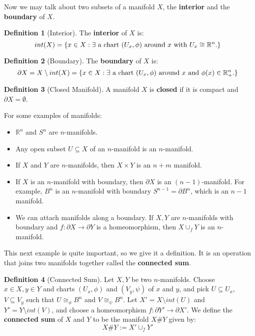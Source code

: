 \documentclass[11pt, oneside]{amsart}   	%
\theoremstyle{definition}
\newtheorem{definition}{Definition}[section]
\begin{document}
	Now we may talk about two subsets of a manifold $X$, the \textbf{interior} and the \textbf{boundary} of $X$.
	
	\begin{definition}[Interior]
		The \textbf{interior} of $X$ is:
		$$
			int(X) = \{x\in X : \exists\textnormal{ a chart $(U_x, \phi)$ around $x$ with $U_x\cong\mathbb R^n$.}\}
		$$
	\end{definition}
	
	\begin{definition}[Boundary]
		The \textbf{boundary} of $X$ is:
		$$
			\partial X = X\setminus int(X) = \{x\in X : \exists\textnormal{ a chart $(U_x, \phi)$ around $x$ and $\phi(x)\in\mathbb R^n_+$.}\}
		$$
	\end{definition}
	
	\begin{definition}[Closed Manifold]
		A manifold $X$ is \textbf{closed} if it is compact and $\partial X = \emptyset$.
	\end{definition}
	
	For some examples of manifolds:
	
		\begin{itemize}
		
		\item $\mathbb R^n$ and $S^n$ are $n$-manifolds.
		
		\item Any open subset $U\subseteq X$ of an $n$-manifold is an $n$-manifold.
		
		\item If $X$ and $Y$ are $n$-manifolds, then $X\times Y$ is an $n + m$ manifold.
		
		\item If $X$ is an $n$-manifold with boundary, then $\partial X$ is an $(n - 1)$-manifold. For example, $B^n$ is an $n$-manifold with boundary $S^{n - 1} 
		= \partial B^n$, which is an $n - 1$ manifold.
		
		\item We can attach manifolds along a boundary. If $X, Y$ are $n$-manifolds with boundary and $f : \partial X\rightarrow\partial Y$ is a homeomorphism, 
		then $X\cup_f Y$ is an $n$-manifold.
		
	\end{itemize}
	
	This next example is quite important, so we give it a definition. It is an operation that joins two manifolds together called the \textbf{connected sum}.
	
	\begin{definition}[Connected Sum]
		Let $X, Y$ be two $n$-manifolds. Choose $x\in X, y\in Y$ and charts $(U_x, \phi)$ and $(V_y, \psi)$ of $x$ and $y$, and pick $U\subseteq U_x$, $V
		\subseteq V_y$ such that $U\cong_\phi B^n$ and $V\cong_\psi B^n$. Let $X' = X\setminus int(U)$ and $Y' = Y\setminus int(V)$, and choose a 
		homeomorphism $f : \partial Y'\rightarrow\partial X'$. We define the \textbf{connected sum} of $X$ and $Y$ to be the manifold $X\# Y$ given by:
		$$
			X\# Y := X'\cup_f Y'
		$$
	\end{definition}
	
\end{document}
